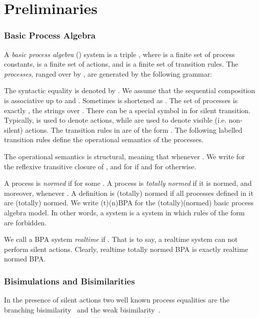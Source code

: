 \documentclass{llncs}
\begin{document}
\section{Preliminaries}\label{sec:Preliminaries}
\subsubsection{Basic Process Algebra}
A {\em basic process algebra} () system is a triple , where  is a finite set of process constants,  is a finite set of actions, and  is a finite set of transition rules.
The {\em processes}, ranged over by ,  are generated by the following grammar:

The syntactic equality is denoted by .
We assume that the sequential composition  is associative up to  and . Sometimes  is shortened as .  The set of processes is exactly , the strings over .
There can be a special symbol  in  for silent transition.  Typically,  is used to denote actions, while  are used to denote visible (i.e. non-silent) actions.
The transition rules in  are of the form .
The following labelled transition rules define the operational semantics of the processes.

The operational semantics is structural, meaning that  whenever .
We write  for the reflexive transitive closure of , and  for  if  and for  otherwise.


A process  is {\em normed} if  for some . A process  is {\em totally normed} if it is normed, and moreover,  whenever .
A  definition   is (totally) normed if all processes defined in it are (totally) normed. We write (t)(n)BPA for the (totally)(normed) basic process algebra model. In other words, a  system is a  system in which rules of the form  are forbidden.

We call a BPA system {\em realtime} if . That is to say, a realtime system can not perform silent actions.
Clearly, realtime totally normed BPA is exactly realtime normed BPA.

\subsubsection{Bisimulations and Bisimilarities}
In the presence of silent actions two well known process equalities are the branching bisimilarity~\cite{GlabbeekW96} and the weak bisimilarity~\cite{Milner1989}.
\end{document}
